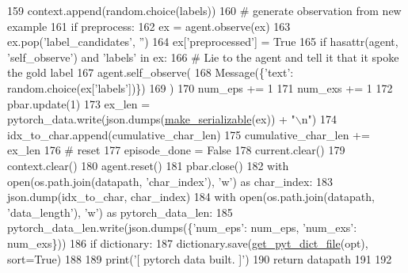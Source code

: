\begin{DoxyCode}
159                     context.append(random.choice(labels))
160                 \textcolor{comment}{# generate observation from new example}
161                 \textcolor{keywordflow}{if} preprocess:
162                     ex = agent.observe(ex)
163                     ex.pop(\textcolor{stringliteral}{'label\_candidates'}, \textcolor{stringliteral}{''})
164                     ex[\textcolor{stringliteral}{'preprocessed'}] = \textcolor{keyword}{True}
165                     \textcolor{keywordflow}{if} hasattr(agent, \textcolor{stringliteral}{'self\_observe'}) \textcolor{keywordflow}{and} \textcolor{stringliteral}{'labels'} \textcolor{keywordflow}{in} ex:
166                         \textcolor{comment}{# Lie to the agent and tell it that it spoke the gold label}
167                         agent.self\_observe(
168                             Message(\{\textcolor{stringliteral}{'text'}: random.choice(ex[\textcolor{stringliteral}{'labels'}])\})
169                         )
170                 num\_eps += 1
171                 num\_exs += 1
172                 pbar.update(1)
173                 ex\_len = pytorch\_data.write(json.dumps(\hyperlink{namespaceparlai_1_1scripts_1_1build__pytorch__data_a1c8f4633b7dc8e990a3e1f6c3e92bd3f}{make\_serializable}(ex)) + \textcolor{stringliteral}{"\(\backslash\)n"})
174                 idx\_to\_char.append(cumulative\_char\_len)
175                 cumulative\_char\_len += ex\_len
176             \textcolor{comment}{# reset}
177             episode\_done = \textcolor{keyword}{False}
178             current.clear()
179             context.clear()
180             agent.reset()
181     pbar.close()
182     with open(os.path.join(datapath, \textcolor{stringliteral}{'char\_index'}), \textcolor{stringliteral}{'w'}) \textcolor{keyword}{as} char\_index:
183         json.dump(idx\_to\_char, char\_index)
184     with open(os.path.join(datapath, \textcolor{stringliteral}{'data\_length'}), \textcolor{stringliteral}{'w'}) \textcolor{keyword}{as} pytorch\_data\_len:
185         pytorch\_data\_len.write(json.dumps(\{\textcolor{stringliteral}{'num\_eps'}: num\_eps, \textcolor{stringliteral}{'num\_exs'}: num\_exs\}))
186     \textcolor{keywordflow}{if} dictionary:
187         dictionary.save(\hyperlink{namespaceparlai_1_1scripts_1_1build__pytorch__data_a6ec85a5842150af78f5178d75075b0cc}{get\_pyt\_dict\_file}(opt), sort=\textcolor{keyword}{True})
188 
189     print(\textcolor{stringliteral}{'[ pytorch data built. ]'})
190     \textcolor{keywordflow}{return} datapath
191 
192 
\end{DoxyCode}
\mbox{\label{namespaceparlai_1_1scripts_1_1build__pytorch__data_a6ec85a5842150af78f5178d75075b0cc}} 
